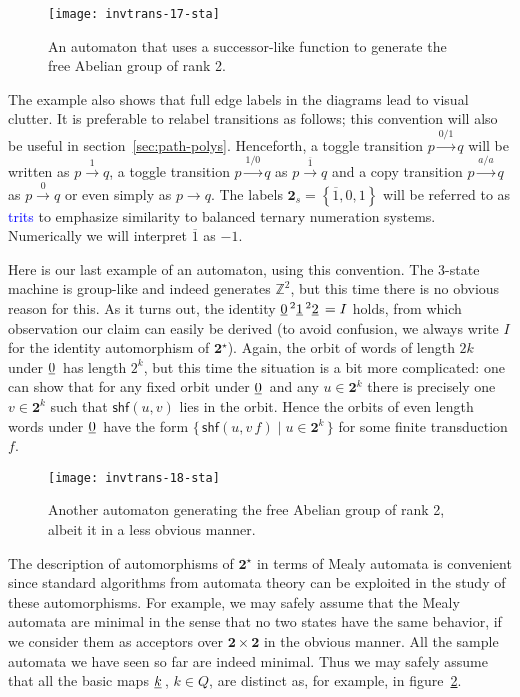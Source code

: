 \documentclass[12pt]{svmult}
\def\emph#1{\textcolor{blue}{#1}}
\def\2{\mathbf{2}}
\def\F#1{\underline{\smash{#1}}\,}       %
\def\SS{\Star{\2}}
\def\gshuf{\mathsf{shf}}
\def\set#1#2{\{\, {#1} \mid {#2}\,\}}
\def\setof#1{\left\{ {#1} \right\}}
\def\Z{\mathbb{Z}}
\def\trans#1#2#3{{#1}\stackrel{{#2}}{\longrightarrow}{#3}}
\def\trtm{\overline{1}}
\def\trtp{1}
\def\trtz{0}
\def\tsym{\2_{s}}               %
\providecommand{\Star}[1]{{#1}^{\star}}
\begin{document}
\begin{figure}[t]
  \centering
  \texttt{[image: invtrans-17-sta]}
  \caption{An automaton that uses a successor-like function to generate the free 
    Abelian group of rank 2.}
  \label{fig:exotic-counter-2}
\end{figure}

The example also shows that full edge labels in the diagrams lead to visual clutter. 
It is preferable to relabel transitions as follows; 
this convention will also be useful in section~\ref{sec:path-polys}.
Henceforth, a toggle transition $\trans{p}{0/1}{q}$ will be written as $\trans{p}{1}{q}$,
a toggle transition $\trans{p}{1/0}{q}$  as $\trans{p}{\trtm}{q}$  
and a copy transition $\trans{p}{a/a}{q}$  as $\trans{p}{0}{q}$ or even 
simply as $\trans{p}{}{q}$. 
The labels $\tsym = \setof{\trtm,\trtz,\trtp}$ will be referred to as \emph{trits} to emphasize 
similarity to balanced ternary numeration systems. 
Numerically we will interpret $\trtm$ as $-1$. 

Here is our last example of an automaton, using this convention. 
The 3-state machine is group-like and indeed generates $\Z^2$, but this time there 
is no obvious reason for this. 
As it turns out, the identity  $\F{0}^{2}\F{1}^{2}\F{2} = I$ holds, from which 
observation our claim can easily be derived (to avoid confusion, we always write $I$ for 
the identity automorphism of $\SS$). 
Again, the orbit of words of length $2k$ under $\F{0}$ has length $2^{k}$, 
but this time the situation is a bit more complicated:
one can show that for any fixed orbit under $\F{0}$ and any  $u \in \2^{k}$ there is precisely 
one $v \in \2^{k}$ such that $\gshuf(u,v)$ lies in the orbit. 
Hence the orbits of even length words under $\F{0}$ have the form  
$\set{ \gshuf(u,v \,f)}{ u \in \2^{k} }$ for some finite transduction $f$. 

\begin{figure}[t]
  \centering
  \texttt{[image: invtrans-18-sta]}
  \caption{Another automaton generating the free Abelian group of rank 2, 
    albeit it in a less obvious manner.}
  \label{fig:CCC-3-2}
\end{figure}


The description of automorphisms of $\SS$ in terms of Mealy automata is convenient 
since standard algorithms from automata theory can be exploited in the study of 
these automorphisms. 
For example, we may safely assume that the Mealy automata are minimal in the sense 
that no two states have the same behavior, if we consider them as acceptors over 
$\2 \times \2$ in the obvious manner. 
All the sample automata we have seen so far are indeed minimal. 
Thus we may safely assume that all the basic maps $\F{k}$, $k \in Q$, are distinct as,
for example, in figure~\ref{fig:CCC-3-2}. 
\end{document}
